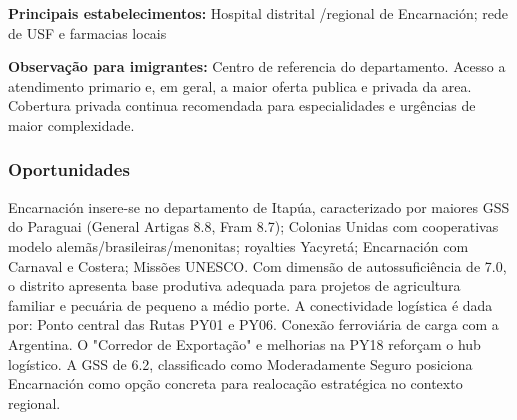 \textbf{Principais estabelecimentos:} Hospital distrital /\allowbreak  regional de
Encarnación; rede de USF e farmacias locais

\textbf{Observação para imigrantes:} Centro de referencia do
departamento. Acesso a atendimento primario e, em geral, a maior oferta
publica e privada da area. Cobertura privada continua recomendada para
especialidades e urgências de maior complexidade.
\newpage

\subsubsection*{Oportunidades}\label{oport-encarnacion-0701}
Encarnación insere-se no departamento de Itapúa, caracterizado por maiores GSS do Paraguai (General Artigas 8.8, Fram 8.7); Colonias Unidas com cooperativas modelo alemãs/brasileiras/menonitas; royalties Yacyretá; Encarnación com Carnaval e Costera; Missões UNESCO. Com dimensão de autossuficiência de 7.0, o distrito apresenta base produtiva adequada para projetos de agricultura familiar e pecuária de pequeno a médio porte. A conectividade logística é dada por: Ponto central das Rutas PY01 e PY06. Conexão ferroviária de carga com a Argentina. O "Corredor de Exportação" e melhorias na PY18 reforçam o hub logístico. A GSS de 6.2, classificado como Moderadamente Seguro posiciona Encarnación como opção concreta para realocação estratégica no contexto regional.

